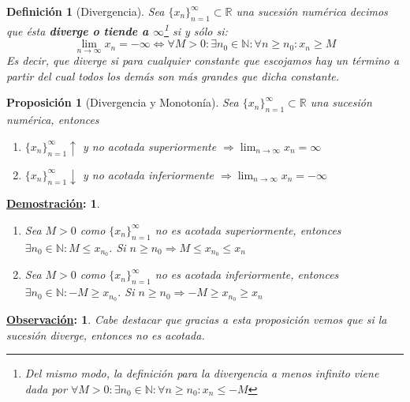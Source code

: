 \documentclass[10pt,a4paper,openright]{book}
\theoremstyle{break}
\newtheorem*{defi}{Definición}
\newtheorem*{prop}{Proposición}
\newtheorem*{demo}{\underline{Demostración}:}
\newtheorem*{obs}{\underline{Observación}:}
\begin{document}
\begin{defi}[Divergencia]
Sea $\{x_n\}_{n=1}^\infty\subset \mathbb R$ una sucesión numérica decimos que ésta \textbf{diverge o tiende a $\infty$}\footnote{Del mismo modo, la definición para la divergencia a menos infinito viene dada por $\forall M>0: \exists n_0\in \mathbb N: \forall n \geq n_0: x_n\leq -M$} si y sólo si:
$$\lim_{n\rightarrow \infty} x_n=-\infty \Leftrightarrow \forall M>0: \exists n_0\in \mathbb N: \forall n \geq n_0: x_n\geq M$$
Es decir, que diverge si para cualquier constante que escojamos hay un término a partir del cual todos los demás son más grandes que dicha constante.
\end{defi}

\begin{prop}[Divergencia y Monotonía]
Sea $\{x_n\}_{n=1}^\infty\subset \mathbb R$ una sucesión numérica, entonces
\begin{enumerate}
\item $\{x_n\}_{n=1}^\infty \uparrow$ y no acotada superiormente $\Rightarrow \lim_{n\rightarrow \infty} x_n=\infty$

\item $\{x_n\}_{n=1}^\infty \downarrow$ y no acotada inferiormente $\Rightarrow \lim_{n\rightarrow \infty} x_n=-\infty$
\end{enumerate}
\end{prop}
\begin{demo}
\begin{enumerate}
\item Sea $M>0$ como $\{x_n\}_{n=1}^\infty $ no es acotada superiormente, entonces $\exists n_0\in \mathbb N: M\leq x_{n_0}$. Si $n\geq n_0\Rightarrow M\leq x_{n_0}\leq x_n$

\item Sea $M>0$ como $\{x_n\}_{n=1}^\infty $ no es acotada inferiormente, entonces $\exists n_0\in \mathbb N: -M\geq x_{n_0}$. Si $n\geq n_0\Rightarrow -M\geq x_{n_0}\geq x_n$
\end{enumerate}
\end{demo}

\begin{obs}
Cabe destacar que gracias a esta proposición vemos que si la sucesión diverge, entonces no es acotada.
\end{obs}
\end{document}

